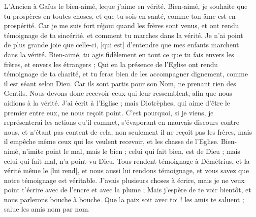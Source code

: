 \BFont
\begin{multicols}{2}
\VerseOne{}L'Ancien à Gaïus le bien-aimé, leque j'aime en vérité.
Bien-aimé, je souhaite que tu prospères en toutes choses, et que tu sois en santé, comme ton âme est en prospérité.
Car je me suis fort réjoui quand les frères sont venus, et ont rendu témoignage de ta sincérité, et comment tu marches dans la vérité.
Je n'ai point de plus grande joie que celle-ci, [qui est] d'entendre que mes enfants marchent dans la vérité.
Bien-aimé, tu agis fidèlement en tout ce que tu fais envers les frères, et envers les étrangers ;
Qui en la présence de l'Eglise ont rendu témoignage de ta charité, et tu feras bien de les accompagner dignement, comme il est séant selon Dieu.
Car ils sont partis pour son Nom, ne prenant rien des Gentils.
Nous devons donc recevoir ceux qui leur ressemblent, afin que nous aidions à la vérité.
J'ai écrit à l'Eglise ; mais Diotrèphes, qui aime d'être le premier entre eux, ne nous reçoit point.
C'est pourquoi, si je viens, je représenterai les actions qu'il commet, s'évaporant en mauvais discours contre nous, et n'étant pas content de cela, non seulement il ne reçoit pas les frères, mais il empêche même ceux qui les veulent recevoir, et les chasse de l'Eglise.
Bien-aimé, n'imite point le mal, mais le bien ; celui qui fait bien, est de Dieu ; mais celui qui fait mal, n'a point vu Dieu.
Tous rendent témoignage à Démétrius, et la vérité même le [lui rend], et nous aussi lui rendons témoignage, et vous savez que notre témoignage est véritable.
J'avais plusieurs choses à écrire, mais je ne veux point t'écrire avec de l'encre et avec la plume ;
Mais j'espère de te voir bientôt, et nous parlerons bouche à bouche.
Que la paix soit avec toi ! les amis te saluent ; salue les amis nom par nom.
\PPE{}
\end{multicols}
